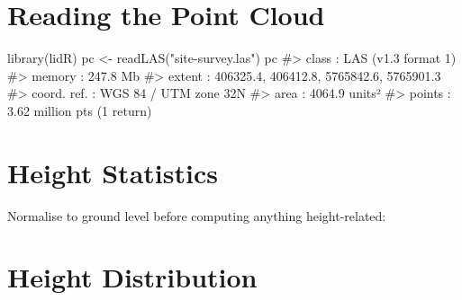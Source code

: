 \documentclass[
  11pt,
  letterpaper,
  DIV=11,
  numbers=noendperiod]{scrreprt}
\newenvironment{Shaded}{\begin{snugshade}}{\end{snugshade}}
\newcommand{\AttributeTok}[1]{\textcolor[rgb]{0.40,0.45,0.13}{#1}}
\newcommand{\CommentTok}[1]{\textcolor[rgb]{0.37,0.37,0.37}{#1}}
\newcommand{\FloatTok}[1]{\textcolor[rgb]{0.68,0.00,0.00}{#1}}
\newcommand{\FunctionTok}[1]{\textcolor[rgb]{0.28,0.35,0.67}{#1}}
\newcommand{\NormalTok}[1]{\textcolor[rgb]{0.00,0.23,0.31}{#1}}
\newcommand{\OtherTok}[1]{\textcolor[rgb]{0.00,0.23,0.31}{#1}}
\newcommand{\SpecialCharTok}[1]{\textcolor[rgb]{0.37,0.37,0.37}{#1}}
\newcommand{\StringTok}[1]{\textcolor[rgb]{0.13,0.47,0.30}{#1}}
\begin{document}
\section{Reading the Point Cloud}\label{reading-the-point-cloud}

\begin{Shaded}
\begin{Highlighting}[]
\FunctionTok{library}\NormalTok{(lidR)}
\NormalTok{pc }\OtherTok{\textless{}{-}} \FunctionTok{readLAS}\NormalTok{(}\StringTok{"site{-}survey.las"}\NormalTok{)}
\NormalTok{pc}
\CommentTok{\#\textgreater{} class        : LAS (v1.3 format 1)}
\CommentTok{\#\textgreater{} memory       : 247.8 Mb}
\CommentTok{\#\textgreater{} extent       : 406325.4, 406412.8, 5765842.6, 5765901.3}
\CommentTok{\#\textgreater{} coord. ref.  : WGS 84 / UTM zone 32N}
\CommentTok{\#\textgreater{} area         : 4064.9 units²}
\CommentTok{\#\textgreater{} points       : 3.62 million pts (1 return)}
\end{Highlighting}
\end{Shaded}

\section{Height Statistics}\label{height-statistics}

Normalise to ground level before computing anything height-related:

\begin{Shaded}
\end{Shaded}

\section{Height Distribution}\label{height-distribution}
\end{document}
